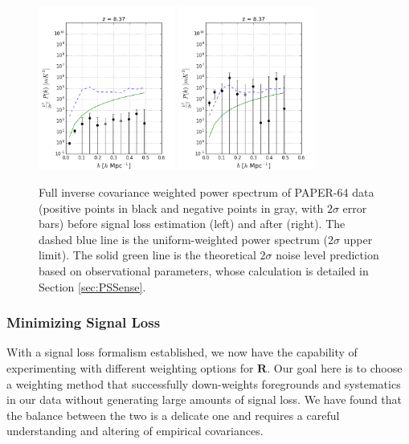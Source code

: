 \documentclass[preprint2,numberedappendix,tighten]{aastex6}  %
\begin{document}
\begin{figure}
	\centering
	\includegraphics[width=0.4\textwidth]{plots/ps2_data_nosigloss.png}
	\includegraphics[width=0.4\textwidth]{plots/ps2_data.png}
	\caption{Full inverse covariance weighted power spectrum of PAPER-64 data (positive points in black and negative points in gray, 
with $2\sigma$ error bars) before signal loss estimation (left) and after (right). The dashed blue line is the uniform-weighted power 
spectrum ($2\sigma$ upper limit). The solid green line is the theoretical $2\sigma$ noise level prediction based on observational 
parameters, whose calculation is detailed in Section \ref{sec:PSSense}.}
	\label{fig:ps2_data}
\end{figure}


\subsubsection{Minimizing Signal Loss}
\label{sec:Weight}

With a signal loss formalism established, we now have the capability of experimenting 
with different weighting options for $\textbf{R}$. Our goal here is to choose a weighting method that successfully down-weights 
foregrounds and systematics in our data without generating large amounts of signal loss. We have found that the balance 
between the two is a delicate one and requires a careful understanding and altering of empirical covariances. 
\end{document}
